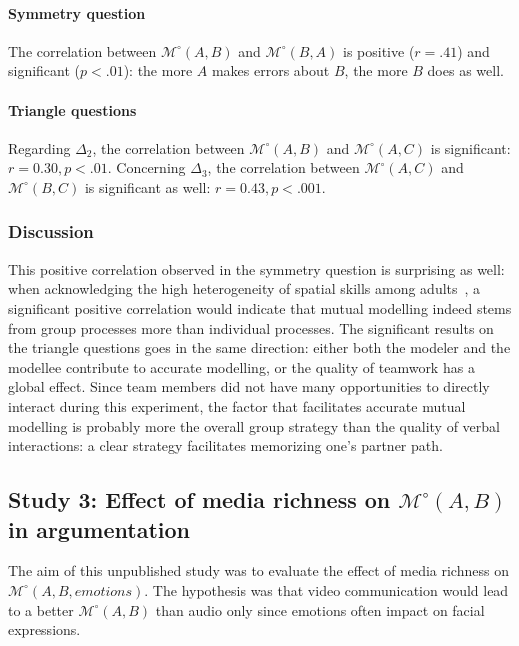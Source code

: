 \documentclass[natbib]{svjour3}
\newcommand{\Model}[3]{{$\mathcal{M}^{\circ}(#1, #2, #3)$}}
\newcommand{\gModel}[2]{{$\mathcal{M}^{\circ}(#1, #2)$}}
\begin{document}
\paragraph{Symmetry question} The correlation between \gModel{A}{B}  and
\gModel{B}{A}  is positive ($r = .41$) and significant ($p < .01$): the more $A$
makes errors about $B$, the more $B$ does as well.

\paragraph{Triangle questions} Regarding $\Delta_2$, the correlation between
\gModel{A}{B} and \gModel{A}{C} is significant: $r=0.30, p <.01$. Concerning
$\Delta_3$, the correlation between \gModel{A}{C} and \gModel{B}{C} is
significant as well: $r=0.43, p <.001$.

\subsubsection*{Discussion}

This positive correlation observed in the symmetry question is surprising as
well: when acknowledging the high heterogeneity of spatial skills among
adults~\citep{liben1981spatial}, a significant positive correlation would
indicate that mutual modelling indeed stems from group processes more than
individual processes. The significant results on the triangle questions goes in
the same direction: either both the modeler and the modellee contribute to
accurate modelling, or the quality of teamwork has a global effect. Since team
members did not have many opportunities to directly interact during this
experiment, the factor that facilitates accurate mutual modelling is probably
more the overall group strategy than the quality of verbal interactions: a clear
strategy facilitates memorizing one's partner path. 




\subsection{Study 3:  Effect of media richness on \gModel{A}{B} in argumentation}

The aim of this unpublished study was to evaluate the effect of media richness
on \Model{A}{B}{emotions}. The hypothesis was that video communication would
lead to a better \gModel{A}{B} than audio only since emotions often impact on
facial expressions.
\end{document}
